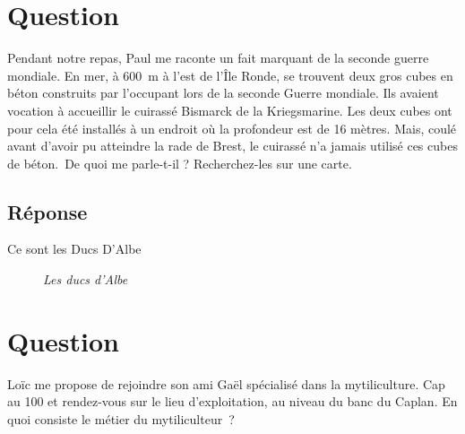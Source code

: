 \documentclass[12pt, report]{article}
\begin{document}
\section{Question}
 Pendant notre repas, Paul me raconte un fait marquant de la seconde guerre mondiale. En mer, à 600 m à l’est de l’Île Ronde, se trouvent deux gros cubes en béton construits par l’occupant lors de la seconde Guerre mondiale. Ils avaient vocation à accueillir le cuirassé Bismarck de la Kriegsmarine. Les deux cubes ont pour cela été installés à un endroit où la profondeur est de 16 mètres. Mais, coulé avant d'avoir pu atteindre la rade de Brest, le cuirassé n’a jamais utilisé ces cubes de béton. De quoi me parle-t-il ? Recherchez-les sur une carte.
\subsection*{Réponse}
Ce sont les Ducs D'Albe
\begin{center}
\begin{figure}[ht]
\caption{\textit{Les ducs d'Albe}}
\end{figure}
\end{center}

\section{Question}
Loïc me propose de rejoindre son ami Gaël spécialisé dans la mytiliculture. Cap au 100 et rendez-vous sur le lieu d’exploitation, au niveau du banc du Caplan. En quoi consiste le métier du mytiliculteur ? 
\end{document}
